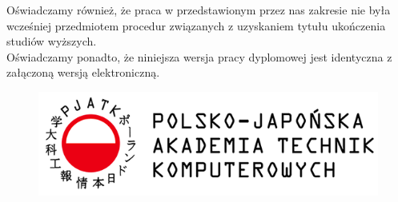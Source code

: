 \documentclass[a4paper,11pt]{report}
\begin{document}
Oświadczamy również, że praca w przedstawionym przez nas zakresie nie była wcześniej przedmiotem procedur związanych z uzyskaniem tytułu ukończenia studiów wyższych.\\
Oświadczamy ponadto, że niniejsza wersja pracy dyplomowej jest identyczna z załączoną wersją elektroniczną.\\
\newpage
\begin{figure}[ht]
	\centering
	\includegraphics{pjatk}
\end{figure}
\end{document}
